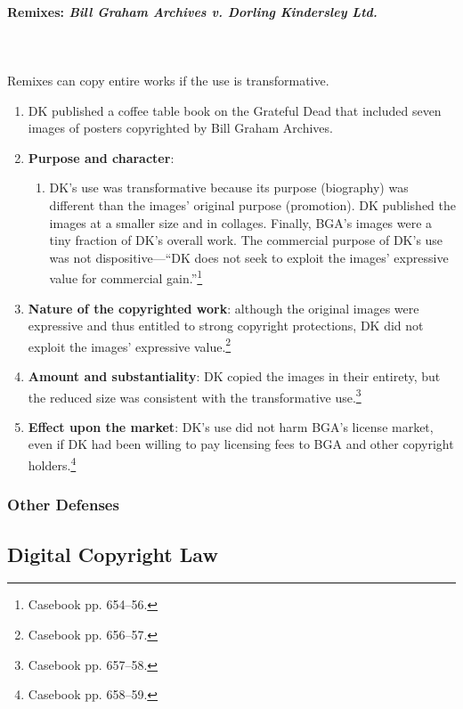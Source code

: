 \paragraph{Remixes: \emph{Bill Graham Archives v. Dorling Kindersley Ltd.}}
~\\\\
Remixes can copy entire works if the use is transformative.

\begin{enumerate}
    \item DK published a coffee table book on the Grateful Dead that included 
    seven images of posters copyrighted by Bill Graham Archives.
    \item \textbf{Purpose and character}:
    \begin{enumerate}
        \item DK's use was transformative because its purpose (biography) was 
        different than the images' original purpose (promotion). DK published 
        the images at a smaller size and in collages. Finally, BGA's images 
        were a tiny fraction of DK's overall work. The commercial purpose of 
        DK's use was not dispositive---``DK does not seek to exploit the 
        images' expressive value for commercial gain.''\footnote{Casebook pp. 
        654--56.}
    \end{enumerate}
    \item \textbf{Nature of the copyrighted work}: although the original 
    images were expressive and thus entitled to strong copyright protections, 
    DK did not exploit the images' expressive value.\footnote{Casebook pp. 
    656--57.}
    \item \textbf{Amount and substantiality}: DK copied the images in their 
    entirety, but the reduced size was consistent with the transformative 
    use.\footnote{Casebook pp. 657--58.}
    \item \textbf{Effect upon the market}: DK's use did not harm BGA's license 
    market, even if DK had been willing to pay licensing fees to BGA and other 
    copyright holders.\footnote{Casebook pp. 658--59.}
\end{enumerate}

\subsubsection{Other Defenses}


\subsection{Digital Copyright Law}

